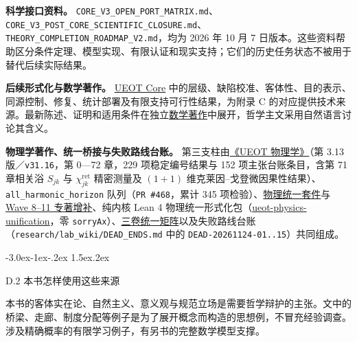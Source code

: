 \documentclass[
  11pt,
  oneside]{book}
\makeatletter
\renewcommand\section{\@startsection{section}{1}{\z@}%
  {-3.0ex\@plus-1ex\@minus-.2ex}%
  {1.5ex\@plus.2ex}%
  {\normalfont\Large\bfseries\raggedright\hyphenpenalty=10000\exhyphenpenalty=10000}}
\makeatother
\begin{document}
\textbf{科学接口资料。} \nolinkurl{CORE_V3_OPEN_PORT_MATRIX.md}、\nolinkurl{CORE_V3_POST_CORE_SCIENTIFIC_CLOSURE.md}、\nolinkurl{THEORY_COMPLETION_ROADMAP_V2.md}，均为 2026 年 10 月 7 日版本。这些资料帮助区分条件定理、模型实现、有限认证和现实支持；它们的历史任务状态不被用于替代后续实际结果。

\textbf{后续形式化与数学著作。} \href{https://github.com/MurphyHoops/UEOT/blob/3d443ec29eb17af1fc00699a74e2d42d73516d81/formalization/ueot-core/}{UEOT Core} 中的层级、缺陷校准、客体性、目的表示、同源控制、修复、统计部署及有限支持可行性结果，为附录 C 的对应提供技术来源。最新陈述、证明和适用条件在独立\href{https://github.com/MurphyHoops/UEOT/blob/3d443ec29eb17af1fc00699a74e2d42d73516d81/mathematics/UEOT_MATHEMATICS.md}{数学著作}中展开，哲学主文采用自然语言讨论其含义。

\textbf{物理学著作、统一桥接与失败路线台账。} 第三支柱由\href{https://github.com/MurphyHoops/UEOT/blob/3d443ec29eb17af1fc00699a74e2d42d73516d81/physics/qm/book/UEOT_PHYSICS.md}{《UEOT 物理学》}（第 3.13 版／\texttt{v31.16}，第 0---72 章，229 项稳定编号结果与 152 项主张台账条目，含第 71 章相关浴 \(S_{jk}\) 与 \(\chi^{\mathrm{ret}}_{jk}\) 精密测量及 \((1+1)\) 维克莱因--戈登微因果性结果）、\texttt{all\_harmonic\_horizon} 队列（\texttt{PR\ \#468}，累计 345 项检验）、\href{https://github.com/MurphyHoops/UEOT/blob/3d443ec29eb17af1fc00699a74e2d42d73516d81/physics/unification/README.md}{物理统一套件}与 \href{https://github.com/MurphyHoops/UEOT/blob/3d443ec29eb17af1fc00699a74e2d42d73516d81/physics/unification/WAVE8_11_MONOGRAPH_ADDENDUM.md}{Wave 8--11 专著增补}、纯内核 Lean 4 物理统一形式化包（\href{https://github.com/MurphyHoops/UEOT/blob/3d443ec29eb17af1fc00699a74e2d42d73516d81/formalization/ueot-physics-unification/README.md}{ueot-physics-unification}，零 \texttt{sorryAx}）、\href{https://github.com/MurphyHoops/UEOT/blob/3d443ec29eb17af1fc00699a74e2d42d73516d81/physics/interfaces/PHILOSOPHY_MATHEMATICS_PHYSICS_UNIFICATION_MATRIX.md}{三卷统一矩阵}以及失败路线台账（\nolinkurl{research/lab_wiki/DEAD_ENDS.md} 中的 \texttt{DEAD-20261124-01..15}）共同组成。

\section{D.2 本书怎样使用这些来源}\label{ph-d-2}

本书的客体实在论、自然主义、意义观与规范立场是需要哲学辩护的主张。文中的桥梁、走廊、制度分配等例子是为了展开概念而构造的思想例，不冒充经验调查。涉及精确概率的有限学习例子，有另书的完整数学模型支撑。
\end{document}

